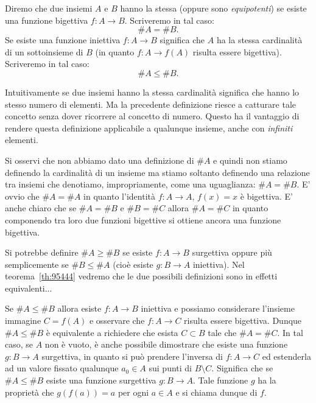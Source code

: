 \begin{definition}[cardinalità]
  Diremo che due insiemi $A$ e $B$ hanno la stessa  
  (oppure sono \emph{equipotenti}) 
  se esiste una funzione bigettiva $f\colon A \to B$.
  Scriveremo in tal caso:
  \[
    \# A = \# B.  
  \] 
  Se esiste una funzione iniettiva $f\colon A\to B$ significa che 
  $A$ ha la stessa cardinalità di un sottoinsieme di $B$ (in quanto $f\colon A \to f(A)$
  risulta essere bigettiva). Scriveremo in tal caso:
  \[
    \# A \le \#B.
  \]
\end{definition}

Intuitivamente se due insiemi hanno la stessa cardinalità 
significa che hanno lo stesso numero di elementi.
Ma la precedente definizione riesce a catturare tale concetto senza dover 
ricorrere al concetto di numero. 
Questo ha il vantaggio di rendere questa definizione applicabile 
a qualunque insieme, anche con \emph{infiniti} elementi.

Si osservi che non abbiamo dato una definizione di $\#A$ e quindi non stiamo 
definendo la cardinalità di un insieme ma stiamo soltanto definendo 
una relazione tra insiemi che 
denotiamo, impropriamente, come una uguaglianza: $\#A = \#B$.
E' ovvio che $\#A = \#A$ in quanto l'identità $f\colon A\to A$, $f(x)=x$ è bigettiva.
E' anche chiaro che se $\#A = \#B$ e $\#B = \#C$ allora $\#A = \#C$ in quanto 
componendo tra loro due funzioni bigettive si ottiene ancora una funzione 
bigettiva.

Si potrebbe definire $\#A \ge \#B$ se esiste $f\colon A\to B$ surgettiva
oppure più semplicemente se $\#B \le \#A$ (cioè esiste $g\colon B\to A$ 
iniettiva). 
Nel teorema~\ref{th:95444} vedremo che le due possibili 
definizioni sono in effetti equivalenti...

Se $\# A \le \# B$ allora esiste $f\colon A\to B$ iniettiva e possiamo considerare l'insieme 
immagine $C=f(A)$ e osservare che $f\colon A \to C$ risulta 
essere bigettiva. 
Dunque $\#A \le \#B$ è equivalente a richiedere 
che esista $C\subset B$ tale che $\#A = \#C$.
In tal caso, se $A$ non è vuoto, è anche possibile dimostrare 
che esiste una funzione $g\colon B\to A$ surgettiva, in quanto 
si può prendere l'inversa di $f\colon A \to C$ ed estenderla 
ad un valore fissato qualunque $a_0\in A$ sui punti di $B\setminus C$.
Significa che se $\#A\le \#B$ esiste una funzione surgettiva 
$g \colon B\to A$. Tale funzione $g$ ha la proprietà che 
$g(f(a))=a$ per ogni $a\in A$ e si chiama dunque 
 di $f$.

